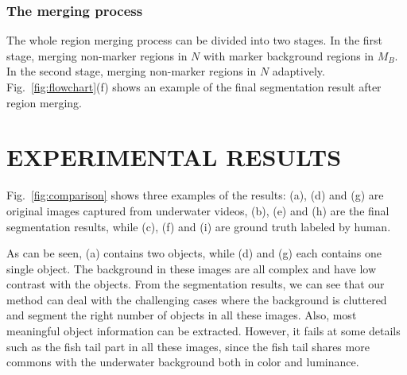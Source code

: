 \documentclass[conference]{IEEEtran}
\begin{document}
\subsubsection{The merging process}

The whole region merging process can be divided into two stages. In the first stage, merging non-marker regions in $N$ with marker background regions in $M_B$. In the second stage, merging non-marker regions in $N$ adaptively. Fig.~\ref{fig:flowchart}(f) shows an example of the final segmentation result after region merging.

\section{EXPERIMENTAL RESULTS}

Fig.~\ref{fig:comparison} shows three examples of the results: (a), (d) and (g) are original images captured from underwater videos, (b), (e) and (h) are the final segmentation results, while (c), (f) and (i) are ground truth labeled by human. 

As can be seen, (a) contains two objects, while (d) and (g) each contains one single object. The background in these images are all complex and have low contrast with the objects. From the segmentation results, we can see that our method can deal with the challenging cases where the background is cluttered and segment the right number of objects in all these images. Also, most meaningful object information can be extracted. However, it fails at some details such as the fish tail part in all these images, since the fish tail shares more commons with the underwater background both in color and luminance.

%
%
\end{document}
